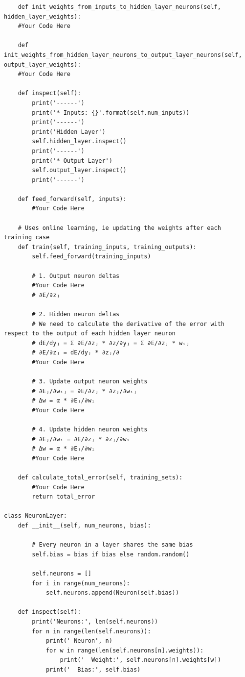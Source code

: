\documentclass[a4paper, 11pt]{article}
\begin{document}
\begin{enumerate}
\begin{lstlisting}
    def init_weights_from_inputs_to_hidden_layer_neurons(self, hidden_layer_weights):
    #Your Code Here

    def init_weights_from_hidden_layer_neurons_to_output_layer_neurons(self, output_layer_weights):    
    #Your Code Here

    def inspect(self):
        print('------')
        print('* Inputs: {}'.format(self.num_inputs))
        print('------')
        print('Hidden Layer')
        self.hidden_layer.inspect()
        print('------')
        print('* Output Layer')
        self.output_layer.inspect()
        print('------')

    def feed_forward(self, inputs):
        #Your Code Here

    # Uses online learning, ie updating the weights after each training case
    def train(self, training_inputs, training_outputs):
        self.feed_forward(training_inputs)

        # 1. Output neuron deltas        
        #Your Code Here
        # ∂E/∂zⱼ       

        # 2. Hidden neuron deltas        
        # We need to calculate the derivative of the error with respect to the output of each hidden layer neuron
        # dE/dyⱼ = Σ ∂E/∂zⱼ * ∂z/∂yⱼ = Σ ∂E/∂zⱼ * wᵢⱼ
        # ∂E/∂zⱼ = dE/dyⱼ * ∂zⱼ/∂
        #Your Code Here

        # 3. Update output neuron weights
        # ∂Eⱼ/∂wᵢⱼ = ∂E/∂zⱼ * ∂zⱼ/∂wᵢⱼ             
        # Δw = α * ∂Eⱼ/∂wᵢ
        #Your Code Here        

        # 4. Update hidden neuron weights
        # ∂Eⱼ/∂wᵢ = ∂E/∂zⱼ * ∂zⱼ/∂wᵢ    
        # Δw = α * ∂Eⱼ/∂wᵢ
        #Your Code Here
                
    def calculate_total_error(self, training_sets):
        #Your Code Here
        return total_error

class NeuronLayer:
    def __init__(self, num_neurons, bias):

        # Every neuron in a layer shares the same bias
        self.bias = bias if bias else random.random()

        self.neurons = []
        for i in range(num_neurons):
            self.neurons.append(Neuron(self.bias))

    def inspect(self):
        print('Neurons:', len(self.neurons))
        for n in range(len(self.neurons)):
            print(' Neuron', n)
            for w in range(len(self.neurons[n].weights)):
                print('  Weight:', self.neurons[n].weights[w])
            print('  Bias:', self.bias)


\end{lstlisting}
\end{enumerate}
\end{document}
